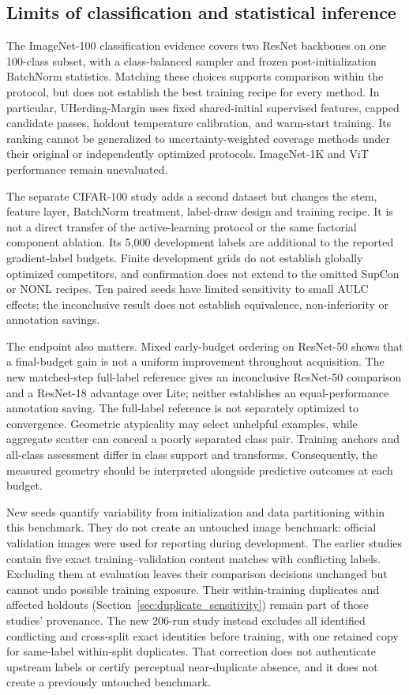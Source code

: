 \documentclass[10pt,a4paper,twocolumn]{article}
\begin{document}
\subsection{Limits of classification and statistical inference}
\label{sec:classification_limits}

The ImageNet-100 classification evidence covers two ResNet backbones
on one 100-class subset, with a class-balanced sampler and frozen
post-initialization BatchNorm statistics. Matching these choices
supports comparison within the protocol, but does not establish the
best training recipe for every method. In particular, UHerding-Margin
uses fixed shared-initial supervised features, capped candidate passes,
holdout temperature calibration, and warm-start training. Its ranking
cannot be generalized to uncertainty-weighted coverage methods under
their original or independently optimized protocols. ImageNet-1K and
ViT performance remain unevaluated.

The separate CIFAR-100 study adds a second dataset but changes the
stem, feature layer, BatchNorm treatment, label-draw design and training
recipe. It is not a direct transfer of the active-learning protocol or
the same factorial component ablation. Its 5,000 development labels are
additional to the reported gradient-label budgets. Finite development
grids do not establish globally optimized competitors, and confirmation
does not extend to the omitted SupCon or NONL recipes. Ten paired seeds
have limited sensitivity to small AULC effects; the inconclusive result
does not establish equivalence, non-inferiority or annotation savings.

The endpoint also matters. Mixed early-budget ordering on ResNet-50
shows that a final-budget gain is not a uniform improvement throughout
acquisition. The new matched-step full-label reference gives an
inconclusive ResNet-50 comparison and a ResNet-18 advantage over Lite;
neither establishes an equal-performance annotation saving. The full-label
reference is not separately optimized to convergence. Geometric atypicality may select
unhelpful examples, while aggregate scatter can conceal a poorly
separated class pair. Training anchors and all-class assessment differ
in class support and transforms. Consequently, the measured geometry
should be interpreted alongside predictive outcomes at each budget.

New seeds quantify variability from initialization and data partitioning
within this benchmark. They do not create an untouched image benchmark:
official validation images were used for reporting during development.
The earlier studies contain five exact training--validation content
matches with conflicting labels. Excluding them at evaluation leaves
their comparison decisions unchanged but cannot undo possible training
exposure. Their within-training duplicates and affected holdouts
(Section~\ref{sec:duplicate_sensitivity}) remain part of those studies'
provenance. The new 206-run study instead excludes all identified
conflicting and cross-split exact identities before training, with one
retained copy for same-label within-split duplicates. That correction
does not authenticate upstream labels or certify perceptual near-duplicate
absence, and it does not create a previously untouched benchmark.
\end{document}
